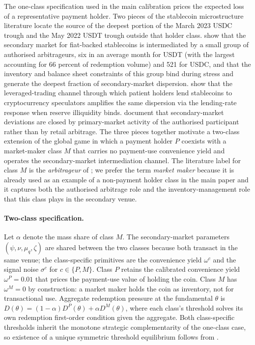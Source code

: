 The one-class specification used in the main calibration prices the expected loss of a representative payment holder. Two pieces of the stablecoin microstructure literature locate the source of the deepest portion of the March 2023 USDC trough and the May 2022 USDT trough outside that holder class. \citet{ma_zeng_zhang_2025} show that the secondary market for fiat-backed stablecoins is intermediated by a small group of authorised arbitrageurs, six in an average month for USDT (with the largest accounting for 66 percent of redemption volume) and 521 for USDC, and that the inventory and balance sheet constraints of this group bind during stress and generate the deepest fraction of secondary-market dispersion. \citet{gorton_klee_ross_ross_vardoulakis_2026} show that the leveraged-trading channel through which patient holders lend stablecoins to cryptocurrency speculators amplifies the same dispersion via the lending-rate response when reserve illiquidity binds. \citet{lyons_viswanath_natraj_2023} document that secondary-market deviations are closed by primary-market activity of the authorised participant rather than by retail arbitrage. The three pieces together motivate a two-class extension of the global game in which a payment holder $P$ coexists with a market-maker class $M$ that carries no payment-use convenience yield and operates the secondary-market intermediation channel. The literature label for class $M$ is the \emph{arbitrageur} of \citet{ma_zeng_zhang_2025}; we prefer the term \emph{market maker} because it is already used as an example of a non-payment holder class in the main paper and it captures both the authorised arbitrage role and the inventory-management role that this class plays in the secondary venue.

\paragraph{Two-class specification.} Let $\alpha$ denote the mass share of class $M$. The secondary-market parameters $(\psi, \nu, \mu_q, \zeta)$ are shared between the two classes because both transact in the same venue; the class-specific primitives are the convenience yield $\omega^c$ and the signal noise $\sigma^c$ for $c \in \{P, M\}$. Class $P$ retains the calibrated convenience yield $\omega^P = 0.01$ that prices the payment-use value of holding the coin. Class $M$ has $\omega^M = 0$ by construction: a market maker holds the coin as inventory, not for transactional use. Aggregate redemption pressure at the fundamental $\theta$ is $D(\theta) = (1-\alpha) D^P(\theta) + \alpha D^M(\theta)$, where each class's threshold solves its own redemption first-order condition given the aggregate. Both class-specific thresholds inherit the monotone strategic complementarity of the one-class case, so existence of a unique symmetric threshold equilibrium follows from \citet{carlsson_van_damme_1993}.

